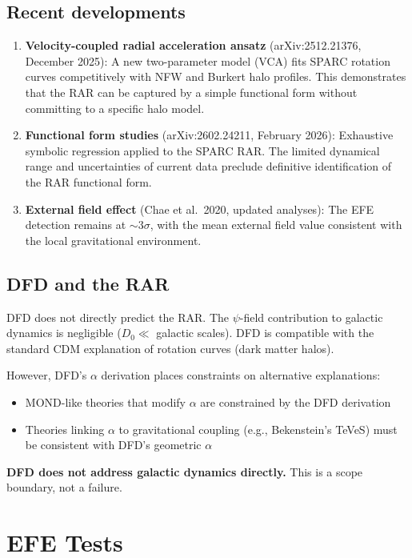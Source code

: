 \documentclass[11pt,a4paper]{article}
\begin{document}
\subsection{Recent developments}

\begin{enumerate}
\item \textbf{Velocity-coupled radial acceleration ansatz} (arXiv:2512.21376, December 2025): A new two-parameter model (VCA) fits SPARC rotation curves competitively with NFW and Burkert halo profiles. This demonstrates that the RAR can be captured by a simple functional form without committing to a specific halo model.

\item \textbf{Functional form studies} (arXiv:2602.24211, February 2026): Exhaustive symbolic regression applied to the SPARC RAR. The limited dynamical range and uncertainties of current data preclude definitive identification of the RAR functional form.

\item \textbf{External field effect} (Chae et al.\ 2020, updated analyses): The EFE detection remains at $\sim 3\sigma$, with the mean external field value consistent with the local gravitational environment.
\end{enumerate}

\subsection{DFD and the RAR}

DFD does not directly predict the RAR. The $\psi$-field contribution to galactic dynamics is negligible ($D_0 \ll$ galactic scales). DFD is compatible with the standard CDM explanation of rotation curves (dark matter halos).

However, DFD's $\alpha$ derivation places constraints on alternative explanations:
\begin{itemize}
\item MOND-like theories that modify $\alpha$ are constrained by the DFD derivation
\item Theories linking $\alpha$ to gravitational coupling (e.g., Bekenstein's TeVeS) must be consistent with DFD's geometric $\alpha$
\end{itemize}

\textbf{DFD does not address galactic dynamics directly.} This is a scope boundary, not a failure.

\section{EFE Tests}
\end{document}
